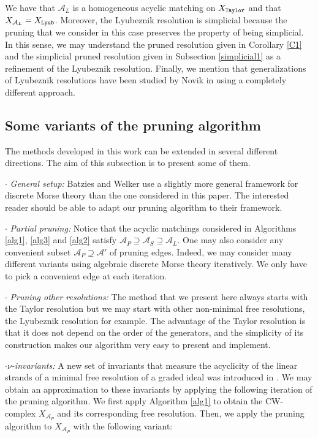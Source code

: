 \documentclass[12pt]{amsart}
\theoremstyle{definition}
\theoremstyle{remark}
\numberwithin{equation}{section}
\newcommand{\cA}{{\mathcal A}}
\begin{document}
We have that $\cA_L$ is a homogeneous acyclic matching on $X_{\tt Taylor}$
and that $X_{\cA_L}=X_{\tt Lyub}$. Moreover, the Lyubeznik resolution is
simplicial because the pruning that we consider in this case
preserves the property of being simplicial. In this sense, we may
understand the pruned resolution given in Corollary \ref{C1} and the
simplicial pruned resolution given in Subsection \ref{simplicial1} as a refinement of the Lyubeznik resolution.
Finally, we mention that generalizations of Lyubeznik resolutions have been studied by Novik in \cite{Nov}
using a completely different approach.


\subsection{Some variants of the pruning algorithm} \label{versions}
The methods developed in this work can be extended in several different directions.
The aim of this subsection is to present some of them.


\vskip 2mm


$\cdot$ {\it General setup:} Batzies and Welker \cite{BW} use a slightly more general framework
for discrete Morse theory than the one considered in this paper. The interested reader
should be able to adapt our pruning algorithm to their framework.

\vskip 2mm


$\cdot$ {\it Partial pruning:} Notice that the acyclic matchings considered in Algorithms \ref{alg1}, \ref{alg3}
and \ref{alg2} satisfy $\cA_P \supseteq \cA_S \supseteq \cA_L.$ One may also consider any convenient subset
$\cA_P \supseteq \cA'$ of pruning edges. Indeed, we may consider
many different variants using algebraic discrete Morse theory iteratively.
We only have to  pick a convenient edge at each iteration.


\vskip 2mm


$\cdot$ {\it Pruning other resolutions:} The method that we present here always starts with the Taylor resolution but
 we may start with other non-minimal free resolutions, the Lyubeznik resolution for example.
The advantage of the Taylor resolution is that it does not depend on the order of the generators, and
the simplicity of its construction makes our algorithm very easy to present and implement.


\vskip 2mm




$\cdot${\it $\nu$-invariants:}  A new set of invariants that measure the acyclicity of the linear strands of a minimal free
resolution of a graded ideal was introduced in \cite{AY}.  We may obtain an approximation to these invariants by applying
the following iteration of the pruning algorithm. We first apply Algorithm \ref{alg1} to obtain the
CW-complex $X_{\cA_P}$ and its corresponding free resolution. Then, we apply  the pruning algorithm to
$X_{\cA_P}$ with the following variant:
\end{document}
